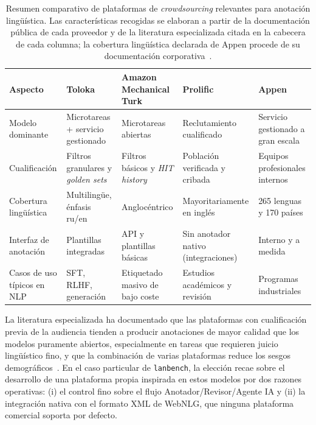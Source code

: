 \begin{table}[ht]
	\centering
	\footnotesize
	\begin{tabular}{p{2.1cm}p{2.6cm}p{2.6cm}p{2.6cm}p{2.6cm}}
		\hline
		\textbf{Aspecto}            & \textbf{Toloka}~\cite{TolokaAbout}        & \textbf{Amazon Mechanical Turk}~\cite{Fort2011_MTurk} & \textbf{Prolific}~\cite{PalanSchitter2018_Prolific} & \textbf{Appen}~\cite{Appen2024Coverage} \\
		\hline
		Modelo dominante            & Microtareas + servicio gestionado         & Microtareas abiertas                                  & Reclutamiento cualificado                           & Servicio gestionado a gran escala       \\
		Cualificación               & Filtros granulares y \textit{golden sets} & Filtros básicos y \textit{HIT history}                & Población verificada y cribada                      & Equipos profesionales internos          \\
		Cobertura lingüística       & Multilingüe, énfasis ru/en                & Anglocéntrico                                         & Mayoritariamente en inglés                          & 265 lenguas y 170 países                \\
		Interfaz de anotación       & Plantillas integradas                     & API y plantillas básicas                              & Sin anotador nativo (integraciones)                 & Interno y a medida                      \\
		Casos de uso típicos en NLP & SFT, RLHF, generación                     & Etiquetado masivo de bajo coste                       & Estudios académicos y revisión                      & Programas industriales                  \\
		\hline
	\end{tabular}
	\caption[Resumen comparativo de plataformas de \textit{crowdsourcing}
		relevantes para anotación lingüística.]{Resumen comparativo de plataformas
		de \textit{crowdsourcing} relevantes para anotación lingüística.
		Las características recogidas se elaboran a partir de la documentación
		pública de cada proveedor y de la literatura especializada citada en la
		cabecera de cada columna; la cobertura lingüística declarada de Appen
		procede de su documentación corporativa~\cite{Appen2024Coverage}.}
	\label{tab:plataformas-crowdsourcing}
\end{table}

La literatura especializada ha documentado que las plataformas con
cualificación previa de la audiencia tienden a producir anotaciones de mayor
calidad que los modelos puramente abiertos, especialmente en tareas que
requieren juicio lingüístico fino, y que la combinación de varias plataformas
reduce los sesgos demográficos~\cite{Douglas2023ProlificMTurk}. En el caso
particular de \texttt{lanbench}, la elección recae sobre el desarrollo de una
plataforma propia inspirada en estos modelos por dos razones operativas: (i) el
control fino sobre el flujo Anotador/Revisor/Agente IA y (ii) la integración
nativa con el formato XML de WebNLG, que ninguna plataforma comercial soporta
por defecto.

